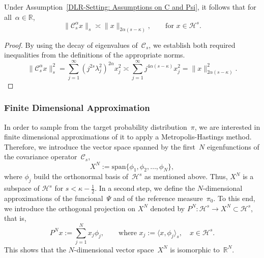 \begin{lemma}\autocite[Lemma 3.3]{Mattingly2010}
\label{DLR-Setting: Smoothing effect of C}
 Under Assumption~\ref{DLR-Setting: Assumptions on C and Psi}, it follows that for all~$\alpha \in \mathbb{R}$,
 \begin{equation}
   \| \mathcal{C}_s^{\alpha} x \|_{s} \asymp \| x \|_{2 \alpha (s - \kappa)}, \qquad \text{for } x \in \mathcal{H}^s.
 \end{equation}
 
\end{lemma}

\begin{proof}
 By using the decay of eigenvalues of~$\mathcal{C}_s$, we establish both required inequalities from the definitions of the appropriate norms.
 \begin{equation*}
   \| \mathcal{C}_s^{\alpha} x \|_{s}^2 = \sum_{j=1}^{\infty} (j^{2 s} \lambda_j^2)^{2 \alpha} x_j^2 \asymp  \sum_{j=1}^{\infty} j^{4 \alpha (s - \kappa)} x_j^2 = \| x \|_{ 2 \alpha ( s - \kappa)}^2.
 \end{equation*}

\end{proof}


\subsubsection{Finite Dimensional Approximation}

In order to sample from the target probability distribution~$\pi$, we are interested in finite dimensional approximations of it to apply a Metropolis-Hastings method. Therefore, we introduce the vector space spanned by the first~$N$ eigenfunctions of the covariance operator~$\mathcal{C}_s$,
\begin{equation}
 X^N := \text{span} \{ \phi_1, \phi_2, \dots , \phi_N \},
\end{equation}
where $\phi_j$ build the orthonormal basis of~$\mathcal{H}^s$ as mentioned above. Thus, $X^N$ is a subspace of $\mathcal{H}^s$ for $s < \kappa - \tfrac{1}{2}$. In a second step, we define the $N$-dimensional approximations of the funcional~$\Psi$ and of the reference measure~$\pi_0$. To this end, we introduce the orthogonal projection on $X^N$ denoted by $P^N : \mathcal{H}^s \to X^N \subset \mathcal{H}^s$, that is,
\begin{equation*}
 P^N x := \sum_{j=1}^N  x_j \phi_j, \qquad \text{where } x_j := \langle x, \phi_j\rangle_s, \quad x \in \mathcal{H}^s.
\end{equation*}
This shows that the $N$-dimensional vector space~$X^N$ is isomorphic to~$\mathbb{R}^N$.

